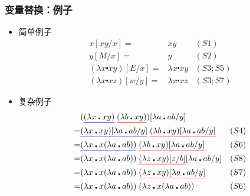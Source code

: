 \documentclass[CJKutf8,compress,hyperref]{beamer}
\begin{document}
\begin{CJK}{UTF8}{song}
\begin{frame}
  \frametitle{变量替换：例子}  
  \begin{itemize}
  \item {简单例子}    
    \begin{eqnarray*}
      x[xy/x] = & xy  & (S1) \\ 
      y[M/x] = & y & (S2) \\ 
      (\lambda x \centerdot  xy)[E/x] = & \lambda x \centerdot xy & (S3;S5) \\  
      (\lambda x \centerdot  xz)[w/y] = & \lambda x \centerdot xz & (S3;S7) 
    \end{eqnarray*} 
  \item {复杂例子} 
    \begin{eqnarray*}
      & ({\color{blue}\underline{{\color{black}(\lambda x \centerdot xy)}}} \;  
        {\color{red}\underline{{\color{black}(\lambda b \centerdot xy)}}}) 
        [\lambda a \centerdot ab/y] & \\ 
      = & {\color{blue}\underline{{\color{black}
          (\lambda x \centerdot xy) [\lambda a \centerdot ab/y]}}} \;  
          {\color{red}\underline{{\color{black}(\lambda b \centerdot xy) 
          [\lambda a \centerdot ab/y]}}} & (S4)  \\  
      = & {\color{blue}\underline{{\color{black}
          (\lambda x \centerdot x(\lambda a \centerdot ab))}}} \;
          {\color{red}\underline{{\color{black}(\lambda b \centerdot xy) 
          [\lambda a \centerdot ab/y]}}} & (S6) \\  
      = & (\lambda x \centerdot x(\lambda a \centerdot ab)) \; 
          {\color{red}\underline{{\color{black}(\lambda z \centerdot xy) [z/b]}}}
          [\lambda a \centerdot ab/y] & (S8) \\  
      = & (\lambda x \centerdot x(\lambda a \centerdot ab)) \; 
          {\color{red}\underline{{\color{black}
          (\lambda z \centerdot xy) [\lambda a \centerdot ab/y]}}} & (S7) \\ 
      = & (\lambda x \centerdot x(\lambda a \centerdot ab)) \; 
          (\lambda z \centerdot x(\lambda a \centerdot ab)) & (S6) 
    \end{eqnarray*}
  \end{itemize}
\end{frame}


\end{CJK}
\end{document}
